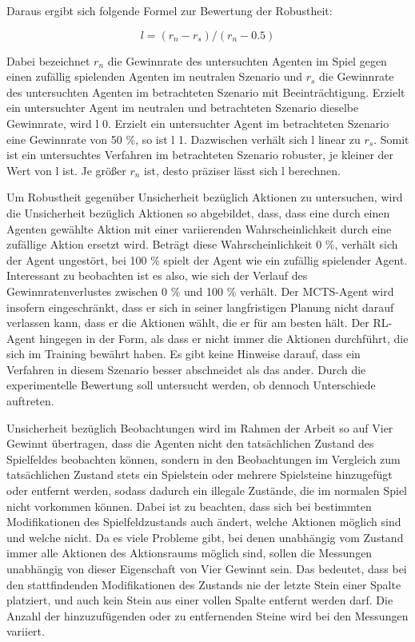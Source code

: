 Daraus ergibt sich folgende Formel zur Bewertung der Robustheit:

\[l = (r_n - r_s) / (r_n - 0.5)\]

Dabei bezeichnet $r_n$ die Gewinnrate des untersuchten Agenten im Spiel gegen einen zufällig spielenden Agenten im neutralen Szenario und $r_s$ die Gewinnrate des untersuchten Agenten im betrachteten Szenario mit Beeinträchtigung. Erzielt ein untersuchter Agent im neutralen und betrachteten Szenario dieselbe Gewinnrate, wird l 0. Erzielt ein untersuchter Agent im betrachteten Szenario eine Gewinnrate von 50 \%, so ist l 1. Dazwischen verhält sich l linear zu $r_s$. Somit ist ein untersuchtes Verfahren im betrachteten Szenario robuster, je kleiner der Wert von l ist. Je größer $r_n$ ist, desto präziser lässt sich l berechnen.

Um Robustheit gegenüber Unsicherheit bezüglich Aktionen zu untersuchen, wird die Unsicherheit bezüglich Aktionen so abgebildet, dass, dass eine durch einen Agenten gewählte Aktion mit einer variierenden Wahrscheinlichkeit durch eine zufällige Aktion ersetzt wird. Beträgt diese Wahrscheinlichkeit 0 \%, verhält sich der Agent ungestört, bei 100 \% spielt der Agent wie ein zufällig spielender Agent. Interessant zu beobachten ist es also, wie sich der Verlauf des Gewinnratenverlustes zwischen 0 \% und 100 \% verhält. Der MCTS-Agent wird insofern eingeschränkt, dass er sich in seiner langfristigen Planung nicht darauf verlassen kann, dass er die Aktionen wählt, die er für am besten hält. Der RL-Agent hingegen in der Form, als dass er nicht immer die Aktionen durchführt, die sich im Training bewährt haben. Es gibt keine Hinweise darauf, dass ein Verfahren in diesem Szenario besser abschneidet als das ander. Durch die experimentelle Bewertung soll untersucht werden, ob dennoch Unterschiede auftreten.

Unsicherheit bezüglich Beobachtungen wird im Rahmen der Arbeit so auf Vier Gewinnt übertragen, dass die Agenten nicht den tatsächlichen Zustand des Spielfeldes beobachten können, sondern in den Beobachtungen im Vergleich zum tatsächlichen Zustand stets ein Spielstein oder mehrere Spielsteine hinzugefügt oder entfernt werden, sodass dadurch ein illegale Zustände, die im normalen Spiel nicht vorkommen können. Dabei ist zu beachten, dass sich bei bestimmten Modifikationen des Spielfeldzustands auch ändert, welche Aktionen möglich sind und welche nicht. Da es viele Probleme gibt, bei denen unabhängig vom Zustand immer alle Aktionen des Aktionsraums möglich sind, sollen die Messungen unabhängig von dieser Eigenschaft von Vier Gewinnt sein. Das bedeutet, dass bei den stattfindenden Modifikationen des Zustands nie der letzte Stein einer Spalte platziert, und auch kein Stein aus einer vollen Spalte entfernt werden darf. Die Anzahl der hinzuzufügenden oder zu entfernenden Steine wird bei den Messungen variiert.

